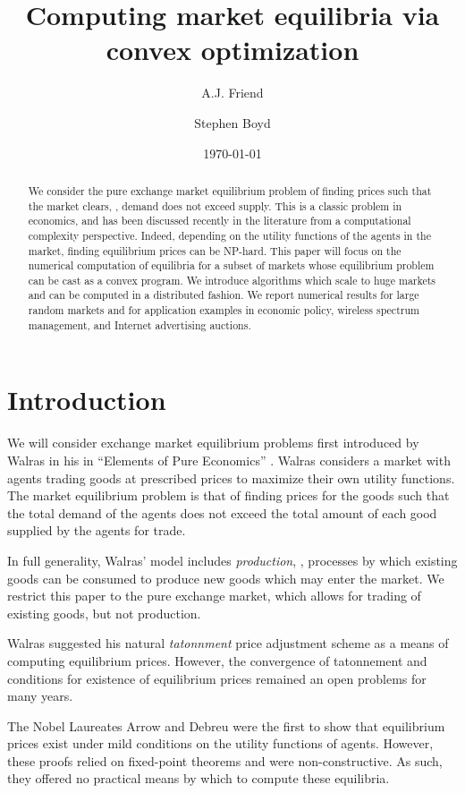 \documentclass[12pt]{article}
\title{Computing market equilibria via convex optimization}
\author{A.J. Friend \and Stephen Boyd}
\date{\today}
\begin{document}
\maketitle

\begin{abstract}
We consider the pure exchange market equilibrium problem of finding prices
such that the market clears, \ie, demand does not exceed supply.
This is a classic problem in economics, and has been discussed recently
in the literature from a computational complexity perspective.
Indeed, depending on the utility functions of the agents in the market,
finding equilibrium prices can be NP-hard.
This paper will focus on the numerical computation
of equilibria for a subset of markets whose equilibrium
problem can be cast as a convex program.
We introduce algorithms which scale to huge markets and can be computed
in a distributed fashion.
We report numerical results for large random markets and for
application examples in economic policy, wireless spectrum management,
and Internet advertising auctions.
\end{abstract}

\newpage
\tableofcontents
\newpage

\section{Introduction}
We will consider exchange market equilibrium problems first introduced by
Walras in his in ``Elements of Pure Economics''
\cite{walras1896elements}.
Walras considers a market with agents trading
goods at prescribed prices to maximize their own utility functions.
The market equilibrium problem is that of finding prices for the goods
such that the total demand of the agents does not exceed the total amount
of each good supplied by the agents for trade.

In full generality, Walras' model includes \emph{production}, \ie, processes by which existing goods can be consumed to produce new goods which may enter the market.
We restrict this paper to the pure exchange market, which allows for trading of existing goods, but not production.

Walras suggested his natural \emph{tatonnment} price adjustment scheme as a means of computing equilibrium prices.
However, the convergence of tatonnement and conditions for existence of equilibrium prices remained an open problems for many years.

The Nobel Laureates Arrow and Debreu were the first to show that equilibrium
prices exist under mild conditions on the utility functions of agents\cite{arrow1954existence}.
However, these proofs relied on fixed-point theorems and were non-constructive.
As such, they offered no practical means by which to compute these equilibria.
\end{document}
